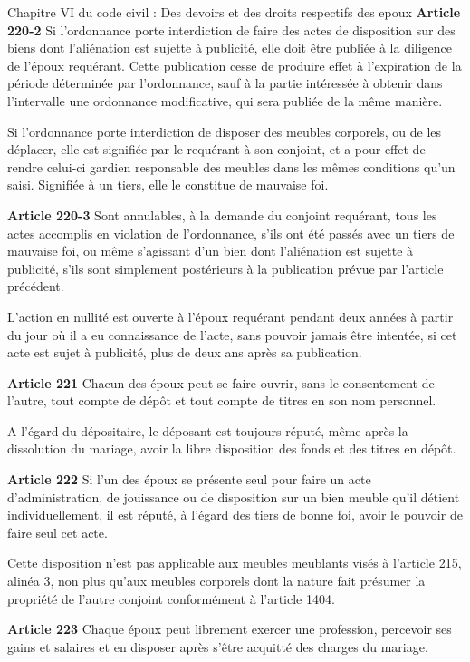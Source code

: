\documentclass[
  12pt,
]{book}
\begin{document}
\begin{encadre}{Chapitre VI du code civil : Des devoirs et des droits respectifs des epoux}
\textbf{Article 220-2}
Si l'ordonnance porte interdiction de faire des actes de disposition sur des biens dont l'aliénation est sujette à publicité, elle doit être publiée à la diligence de l'époux requérant. Cette publication cesse de produire effet à l'expiration de la période déterminée par l'ordonnance, sauf à la partie intéressée à obtenir dans l'intervalle une ordonnance modificative, qui sera publiée de la même manière.

Si l'ordonnance porte interdiction de disposer des meubles corporels, ou de les déplacer, elle est signifiée par le requérant à son conjoint, et a pour effet de rendre celui-ci gardien responsable des meubles dans les mêmes conditions qu'un saisi. Signifiée à un tiers, elle le constitue de mauvaise foi.

\textbf{Article 220-3}
Sont annulables, à la demande du conjoint requérant, tous les actes accomplis en violation de l'ordonnance, s'ils ont été passés avec un tiers de mauvaise foi, ou même s'agissant d'un bien dont l'aliénation est sujette à publicité, s'ils sont simplement postérieurs à la publication prévue par l'article précédent.

L'action en nullité est ouverte à l'époux requérant pendant deux années à partir du jour où il a eu connaissance de l'acte, sans pouvoir jamais être intentée, si cet acte est sujet à publicité, plus de deux ans après sa publication.

\textbf{Article 221}
Chacun des époux peut se faire ouvrir, sans le consentement de l'autre, tout compte de dépôt et tout compte de titres en son nom personnel.

A l'égard du dépositaire, le déposant est toujours réputé, même après la dissolution du mariage, avoir la libre disposition des fonds et des titres en dépôt.

\textbf{Article 222}
Si l'un des époux se présente seul pour faire un acte d'administration, de jouissance ou de disposition sur un bien meuble qu'il détient individuellement, il est réputé, à l'égard des tiers de bonne foi, avoir le pouvoir de faire seul cet acte.

Cette disposition n'est pas applicable aux meubles meublants visés à l'article 215, alinéa 3, non plus qu'aux meubles corporels dont la nature fait présumer la propriété de l'autre conjoint conformément à l'article 1404.

\textbf{Article 223}
Chaque époux peut librement exercer une profession, percevoir ses gains et salaires et en disposer après s'être acquitté des charges du mariage.


\end{encadre}
\end{document}
